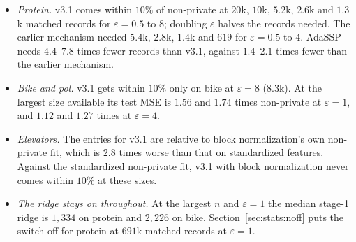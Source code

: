 \begin{itemize}
  \item \emph{Protein.} v3.1 comes within $10\%$ of non-private at $20$k, $10$k, $5.2$k, $2.6$k and $1.3$k matched records for $\varepsilon = 0.5$ to $8$; doubling $\varepsilon$ halves the records needed. The earlier mechanism needed $5.4$k, $2.8$k, $1.4$k and $619$ for $\varepsilon = 0.5$ to $4$. AdaSSP needs $4.4$--$7.8$ times fewer records than v3.1, against $1.4$--$2.1$ times fewer than the earlier mechanism.
  \item \emph{Bike and pol.} v3.1 gets within $10\%$ only on bike at $\varepsilon = 8$ ($8.3$k). At the largest size available its test MSE is $1.56$ and $1.74$ times non-private at $\varepsilon = 1$, and $1.12$ and $1.27$ times at $\varepsilon = 4$.
  \item \emph{Elevators.} The entries for v3.1 are relative to block normalization's own non-private fit, which is $2.8$ times worse than that on standardized features. Against the standardized non-private fit, v3.1 with block normalization never comes within $10\%$ at these sizes.
  \item \emph{The ridge stays on throughout.} At the largest $n$ and $\varepsilon = 1$ the median stage-1 ridge is $1{,}334$ on protein and $2{,}226$ on bike. Section~\ref{sec:stats:noff} puts the switch-off for protein at $691$k matched records at $\varepsilon = 1$.
\end{itemize}

